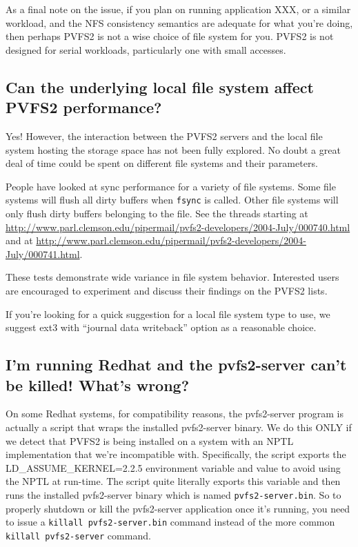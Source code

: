 \documentclass[11pt,letterpaper]{article}
\begin{document}
As a final note on the issue, if you plan on running application XXX,
or a similar workload, and the NFS consistency semantics are adequate
for what you're doing, then perhaps PVFS2 is not a wise choice of file
system for you.  PVFS2 is not designed for serial workloads,
particularly one with small accesses.

\subsection{Can the underlying local file system affect PVFS2 performance?}

Yes!  However, the interaction between the PVFS2 servers and the local
file system hosting the storage space has not been fully explored.  No
doubt a great deal of time could be spent on different file systems
and their parameters.

People have looked at sync performance for a variety of file systems.
Some file systems will flush all dirty buffers when \texttt{fsync} is
called.  Other file systems will only flush dirty buffers belonging to
the file. See the threads starting at
\url{http://www.parl.clemson.edu/pipermail/pvfs2-developers/2004-July/000740.html}
and at
\url{http://www.parl.clemson.edu/pipermail/pvfs2-developers/2004-July/000741.html}.

These tests demonstrate wide variance in file system behavior.
Interested users are encouraged to experiment and discuss their
findings on the PVFS2 lists.

If you're looking for a quick suggestion for a local file system type
to use, we suggest ext3 with ``journal data writeback'' option as a
reasonable choice.

\subsection{I'm running Redhat and the pvfs2-server can't be killed! What's wrong?}

On some Redhat systems, for compatibility reasons, the pvfs2-server
program is actually a script that wraps the installed pvfs2-server
binary.  We do this ONLY if we detect that PVFS2 is being installed on
a system with an NPTL implementation that we're incompatible with.
Specifically, the script exports the LD_ASSUME_KERNEL=2.2.5
environment variable and value to avoid using the NPTL at run-time.
The script quite literally exports this variable and then runs the
installed pvfs2-server binary which is named
\texttt{pvfs2-server.bin}.  So to properly shutdown or kill the
pvfs2-server application once it's running, you need to issue a
\texttt{killall pvfs2-server.bin} command instead of the more common
\texttt{killall pvfs2-server} command.
\end{document}
